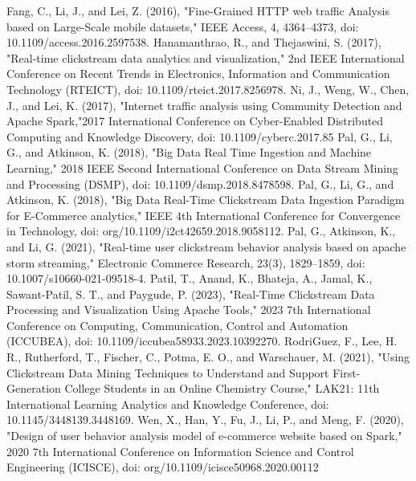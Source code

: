 \documentclass[conference]{IEEEtran}
\begin{document}
\begin{thebibliography}{00}
 Fang, C., Li, J., and Lei, Z. (2016), "Fine-Grained HTTP web traffic Analysis based on Large-Scale mobile datasets," IEEE Access, 4, 4364–4373, doi: 10.1109/access.2016.2597538.
 Hanamanthrao, R., and Thejaswini, S. (2017), "Real-time clickstream data analytics and visualization," 2nd IEEE International Conference on Recent Trends in Electronics, Information and Communication Technology (RTEICT), doi: 10.1109/rteict.2017.8256978.
 Ni, J., Weng, W., Chen, J., and Lei, K. (2017), "Internet traffic analysis using Community Detection and Apache Spark,"2017 International Conference on Cyber-Enabled Distributed Computing and Knowledge Discovery, doi: 10.1109/cyberc.2017.85
 Pal, G., Li, G., and Atkinson, K. (2018), "Big Data Real Time Ingestion and Machine Learning," 2018 IEEE Second International Conference on Data Stream Mining and Processing (DSMP), doi: 10.1109/dsmp.2018.8478598.
 Pal, G., Li, G., and Atkinson, K. (2018), "Big Data Real-Time Clickstream Data Ingestion Paradigm for E-Commerce analytics," IEEE 4th International Conference for Convergence in Technology, doi: org/10.1109/i2ct42659.2018.9058112.
 Pal, G., Atkinson, K., and Li, G. (2021), "Real-time user clickstream behavior analysis based on apache storm streaming," Electronic Commerce Research, 23(3), 1829–1859, doi: 10.1007/s10660-021-09518-4.
 Patil, T., Anand, K., Bhateja, A., Jamal, K., Sawant-Patil, S. T., and Paygude, P. (2023), "Real-Time Clickstream Data Processing and Visualization Using Apache Tools," 2023 7th International Conference on Computing, Communication, Control and Automation (ICCUBEA), doi: 10.1109/iccubea58933.2023.10392270.
 RodriGuez, F., Lee, H. R., Rutherford, T., Fischer, C., Potma, E. O., and Warschauer, M. (2021), "Using Clickstream Data Mining Techniques to Understand and Support First-Generation College Students in an Online Chemistry Course," LAK21: 11th International Learning Analytics and Knowledge Conference, doi: 10.1145/3448139.3448169.
 Wen, X., Han, Y., Fu, J., Li, P., and Meng, F. (2020), "Design of user behavior analysis model of e-commerce website based on Spark," 2020 7th International Conference on Information Science and Control Engineering (ICISCE), doi: org/10.1109/icisce50968.2020.00112
\end{thebibliography}
\vspace{12pt}
\end{document}
